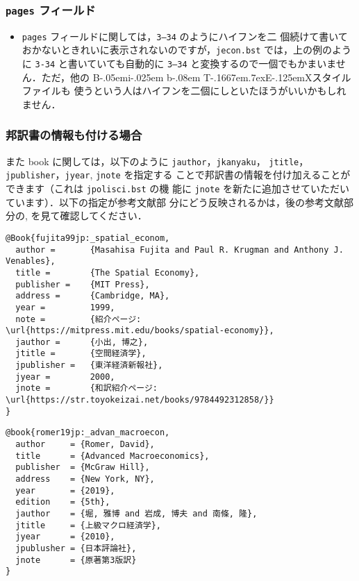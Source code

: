 \documentclass[a4j,10pt]{jarticle}
\def\BibTeX{{\rm B\kern-.05em{\sc i\kern-.025em b}\kern-.08em
    T\kern-.1667em\lower.7ex\hbox{E}\kern-.125emX}}
\begin{document}
\subsubsection{\texttt{pages} フィールド}

\begin{itemize}
 \item \texttt{pages} フィールドに関しては，\texttt{3--34} のようにハイフンを二
       個続けて書いておかないときれいに表示されないのですが，\texttt{jecon.bst}
       では，上の例のように \texttt{3-34} と書いていても自動的に \texttt{3--34}
       と変換するので一個でもかまいません．ただ，他の \BibTeX スタイルファイルも
       使うという人はハイフンを二個にしといたほうがいいかもしれません．
\end{itemize}

\subsubsection{邦訳書の情報も付ける場合} \label{sec:hoyakusho}

また book に関しては，以下のように \texttt{jauthor}，\texttt{jkanyaku}，
\texttt{jtitle}，\texttt{jpublisher}，\texttt{jyear}, \texttt{jnote} を指定する
ことで邦訳書の情報を付け加えることができます（これは \texttt{jpolisci.bst} の機
能に \texttt{jnote} を新たに追加させていただいています）．以下の指定が参考文献部
分にどう反映されるかは，後の参考文献部分の\cite{fujita99jp:_spatial_econom},
\cite{romer19jp:_advan_macroecon}を見て確認してください．\\

\begin{screen}
 \begin{verbatim}
@Book{fujita99jp:_spatial_econom,
  author =       {Masahisa Fujita and Paul R. Krugman and Anthony J. Venables},
  title =        {The Spatial Economy},
  publisher =    {MIT Press},
  address =      {Cambridge, MA},
  year =         1999,
  note =         {紹介ページ: \url{https://mitpress.mit.edu/books/spatial-economy}},
  jauthor =      {小出, 博之},
  jtitle =       {空間経済学},
  jpublisher =   {東洋経済新報社},
  jyear =        2000,
  jnote =        {和訳紹介ページ: \url{https://str.toyokeizai.net/books/9784492312858/}}
}
 \end{verbatim}
\end{screen}
\vspace*{1em}
\begin{screen}
 \begin{verbatim}
@book{romer19jp:_advan_macroecon,
  author     = {Romer, David},
  title      = {Advanced Macroeconomics},
  publisher  = {McGraw Hill},
  address    = {New York, NY},
  year       = {2019},
  edition    = {5th},
  jauthor    = {堀, 雅博 and 岩成, 博夫 and 南條, 隆},
  jtitle     = {上級マクロ経済学},
  jyear      = {2010},
  jpublusher = {日本評論社},
  jnote      = {原著第3版訳}
}
 \end{verbatim}
\end{screen}
\vspace*{1em}
\end{document}
